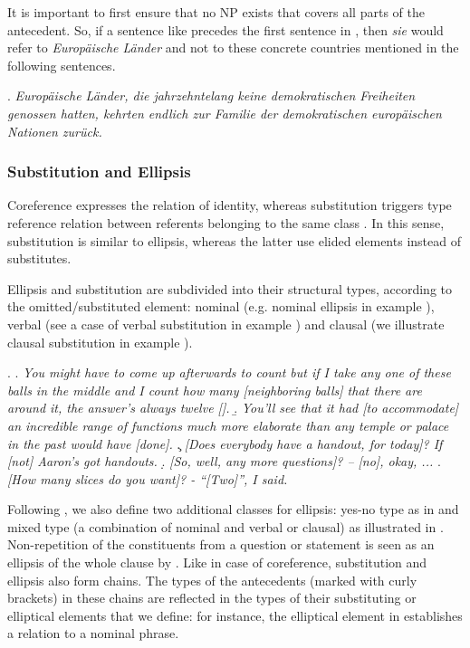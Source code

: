 \documentclass[a4paper]{article}
\begin{document}
It is important to first ensure that no NP exists that covers all parts of the antecedent. So, if a sentence like \Next precedes the first sentence in \Last[b], then {\sl sie} would refer to {\sl Europäische Länder} and not to these concrete countries mentioned in the following sentences.

\ex.
{\sl Europäische Länder, die jahrzehntelang keine demokratischen Freiheiten genossen hatten, kehrten endlich zur Familie der demokratischen europäischen Nationen zurück.}


\subsubsection{Substitution and Ellipsis}\label{sec:substitution}
Coreference expresses the relation of identity, whereas substitution triggers type reference relation between referents belonging to the same class \cite{KunzSteiner2013,deBeaugrandeDressler1981}. In this sense,
substitution is similar to ellipsis, whereas the latter use elided elements
instead of substitutes.

Ellipsis and substitution are subdivided into their structural types,
according to the omitted/substituted element: nominal (e.g. nominal
ellipsis in example \Next[a]), verbal (see a case of verbal substitution in
example \Next[b]) and clausal (we illustrate clausal substitution in example
\Next[c]).

\ex.
\a. {\sl You might have to come up afterwards to count but if I take
any one of these balls in the middle and I count how many
[neighboring balls] that there are around it, the answer's
always twelve [].}
\b. {\sl You'll see that it had [to accommodate] an incredible range
of functions much more elaborate than any temple or palace in
the past would have [done].}
\c. {\sl [Does everybody have a handout, for today]? If [not]
Aaron's got handouts.}
\d. {\sl [So, well, any more questions]? -- [no], okay, ...}
\e. {\sl [How many slices do you want]? - ``[Two]'', I said.}

Following \cite{Menzel2017}, we also define two additional classes for
ellipsis: yes-no type as in \Last[d] and mixed type (a combination of nominal
and verbal or clausal) as illustrated in \Last[e]. Non-repetition of the
constituents from a question or statement is seen as an ellipsis of the whole clause by \cite{HallidayHasan1976}. Like in case of coreference,
substitution and ellipsis also form chains. The types of the antecedents
(marked with curly brackets) in these chains are reflected in the types of
their substituting or elliptical elements that we define: for instance, the
elliptical element in \Last[a] establishes a relation to a nominal phrase.
\end{document}
